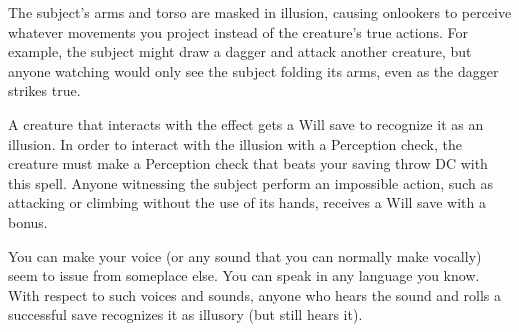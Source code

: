 \spellrng{\rngclose}
\spelldur{\durshort}
\begin{spelleffect}
  The subject's arms and torso are masked in illusion, causing onlookers to perceive whatever movements you project instead of the creature's true actions. For example, the subject might draw a dagger and attack another creature, but anyone watching would only see the subject folding its arms, even as the dagger strikes true.
\end{spelleffect}
\begin{spellnotes}
  A creature that interacts with the effect gets a Will save to recognize it as an illusion. In order to interact with the illusion with a Perception check, the creature must make a Perception check that beats your saving throw DC with this spell. Anyone witnessing the subject perform an impossible action, such as attacking or climbing without the use of its hands, receives a Will save with a  bonus.
\end{spellnotes}

\spellrng{\rngclose}
\begin{spelleffect}
  You can make your voice (or any sound that you can normally make vocally) seem to issue from someplace else. You can speak in any language you know. With respect to such voices and sounds, anyone who hears the sound and rolls a successful save recognizes it as illusory (but still hears it).
\end{spelleffect}

\begin{comment}
\spellsection{Vestments of the Mage}
\spelldesc{You imbue a set of armor with magical power, preventing it from interfering with your spellcasting.}
\spellschool{Transmutation (Imbuement)}
\spelllvl{Sor/Wiz 2}
\spellrng{Touch}
\spelltgt{Touched nonmagical armor or shield}
\spelldur{\durext (D)}
\spellsave{Will negates (harmless, object)}
\spellsr{Yes (Will)}
\begin{spelleffect}
  The armor or shield's chance of arcane spell failure decreases by 10\% as long as you are wearing or using it. If any other creature wears the armor, it receives no benefit from this spell.
\end{spelleffect}
\begin{spellnotes}
  This decrease is considered an enhancement enhancement bonus.
\end{spellnotes}
\end{comment}

